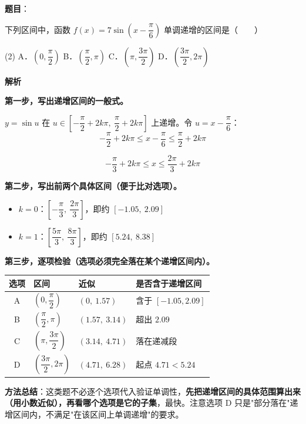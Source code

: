\begin{answer}

\textbf{题目}：

下列区间中，函数 $f(x)=7\sin\left(x-\dfrac\pi6\right)$ 单调递增的区间是\mbox{（　　）}

\begin{gkopts}(2)
\task A．$\left(0,\dfrac\pi2\right)$
\task B．$\left(\dfrac\pi2,\pi\right)$
\task C．$\left(\pi,\dfrac{3\pi}2\right)$
\task D．$\left(\dfrac{3\pi}2,2\pi\right)$
\end{gkopts}

\textbf{解析}

\textbf{第一步，写出递增区间的一般式。}

$y=\sin u$ 在 $u\in\left[-\dfrac\pi2+2k\pi,\ \dfrac\pi2+2k\pi\right]$ 上递增。令 $u=x-\dfrac\pi6$：
\nopagebreak[4]
\[-\frac\pi2+2k\pi\le x-\frac\pi6\le\frac\pi2+2k\pi\]

\nopagebreak[4]
\[-\frac\pi3+2k\pi\le x\le\frac{2\pi}3+2k\pi\]

\textbf{第二步，写出前两个具体区间（便于比对选项）。}

\begin{itemize}
\item $k=0$：$\left[-\dfrac\pi3,\ \dfrac{2\pi}3\right]$，即约 $[-1.05,\ 2.09]$
\item $k=1$：$\left[\dfrac{5\pi}3,\ \dfrac{8\pi}3\right]$，即约 $[5.24,\ 8.38]$
\end{itemize}

\textbf{第三步，逐项检验（选项必须完全落在某个递增区间内）。}

\begin{center}
\begin{tabular}{clll}
\toprule
选项 & 区间 & 近似 & 是否含于递增区间 \\
\midrule
A & $\left(0,\dfrac\pi2\right)$ & $(0,\ 1.57)$ &  含于 $[-1.05,2.09]$ \\
B & $\left(\dfrac\pi2,\pi\right)$ & $(1.57,\ 3.14)$ &  超出 $2.09$ \\
C & $\left(\pi,\dfrac{3\pi}2\right)$ & $(3.14,\ 4.71)$ &  落在递减段 \\
D & $\left(\dfrac{3\pi}2,2\pi\right)$ & $(4.71,\ 6.28)$ &  起点 $4.71<5.24$ \\
\bottomrule
\end{tabular}
\end{center}

\begin{gktip}
\textbf{方法总结}：这类题不必逐个选项代入验证单调性，\textbf{先把递增区间的具体范围算出来（用小数近似），再看哪个选项是它的子集}，最快。注意选项 D 只是"部分落在"递增区间内，不满足"在该区间上单调递增"的要求。
\end{gktip}


\par\medskip

\end{answer}
